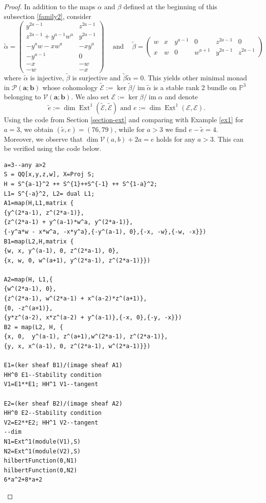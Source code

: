 \documentclass[twoside,reqno]{amsart}
\theoremstyle{plain}
\DeclareMathOperator{\im}{im}
\begin{document}
\begin{proof}
In addition to the maps $\alpha$ and $\beta$ defined at the beginning of this subsection \ref{family2}, consider
$$\tilde{\alpha}= \begin{pmatrix}
y^{2a-1} & z^{2a-1} \\[4pt]
z^{2a-1} + y^{a-1} w^{a} & y^{2a-1} \\[4pt]
-y^{a} w - x w^{a} & -x y^{a} \\[4pt]
-y^{a-1} & 0 \\[4pt]
-x & -w \\[4pt]
-w & -x
\end{pmatrix}\ \ \ \ \mbox{ and } \ \ \ \ \tilde{\beta} = \begin{pmatrix}
w & x & y^{a-1} & 0 & z^{2a-1} & 0 \\
x & w & 0 & w^{a+1} & y^{2a-1} & z^{2a-1}
\end{pmatrix}$$
where $\tilde{\alpha}$ is injective, $\tilde{\beta}$ is surjective and $\tilde{\beta}\tilde{\alpha}=0$. This yields other minimal 
monad in $\mathcal{P}(\boldsymbol{a};\boldsymbol{b})$ whose cohomology $\tilde{\mathcal{E}}:=\ker\tilde{\beta}/\im\tilde{\alpha}$ 
is a stable rank 2 bundle on $\mathbb{P}^3$ belonging to 
$\mathcal{V}(\boldsymbol{a};\boldsymbol{b})$. We also set $\mathcal{E}:=\ker\beta/\im\alpha$ and denote 
$$\tilde{e} := \dim \operatorname{Ext}^1(\tilde{\mathcal{E}}, \tilde{\mathcal{E}}) \mbox{ and } e := \dim \operatorname{Ext}^1(\mathcal{E}, \mathcal{E}).$$
Using the code from Section \ref{section-ext} and comparing with Example \ref{ex1} for $a=3$, we obtain $(\tilde{e}, e) = (76, 79)$, while for $a > 3$ we find $e - \tilde{e} = 4$. Moreover, we observe that 
$\dim \mathcal{V}(a,b) + 2a = e$ holds for any $a > 3$. This can be verified using the code below.

 \begin{lstlisting}[language=Macaulay2]
a=3--any a>2
S = QQ[x,y,z,w], X=Proj S;
H = S^{a-1}^2 ++ S^{1}++S^{-1} ++ S^{1-a}^2;
L1= S^{-a}^2, L2= dual L1;
A1=map(H,L1,matrix {
{y^(2*a-1), z^(2*a-1)},
{z^(2*a-1) + y^(a-1)*w^a, y^(2*a-1)},
{-y^a*w - x*w^a, -x*y^a},{-y^(a-1), 0},{-x, -w},{-w, -x}})
B1=map(L2,H,matrix {
{w, x, y^(a-1), 0, z^(2*a-1), 0},
{x, w, 0, w^(a+1), y^(2*a-1), z^(2*a-1)}})

A2=map(H, L1,{
{w^(2*a-1), 0},
{z^(2*a-1), w^(2*a-1) + x^(a-2)*z^(a+1)},
{0, -z^(a+1)},
{y*z^(a-2), x*z^(a-2) + y^(a-1)},{-x, 0},{-y, -x}})
B2 = map(L2, H, {
{x, 0,  y^(a-1), z^(a+1),w^(2*a-1), z^(2*a-1)},
{y, x, x^(a-1), 0, z^(2*a-1), w^(2*a-1)}})

E1=(ker sheaf B1)/(image sheaf A1)
HH^0 E1--Stability condition
V1=E1**E1; HH^1 V1--tangent

E2=(ker sheaf B2)/(image sheaf A2)
HH^0 E2--Stability condition
V2=E2**E2; HH^1 V2--tangent
--dim
N1=Ext^1(module(V1),S)
N2=Ext^1(module(V2),S)
hilbertFunction(0,N1)
hilbertFunction(0,N2)
6*a^2+8*a+2
\end{lstlisting}
\end{proof}
\end{document}
